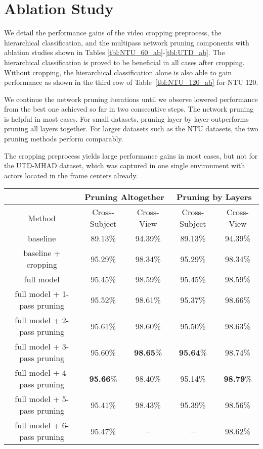 \documentclass{article}
\begin{document}
 \section{Ablation Study}

{We detail the performance gains of the video cropping preprocess, the hierarchical classification, and the multipass network pruning components with ablation studies shown in Tables \ref{tbl:NTU_60_ab}-\ref{tbl:UTD_ab}. The hierarchical classification is proved to be beneficial in all cases after cropping. Without cropping, the hierarchical classification alone is also able to gain performance as shown in the third row of Table~\ref{tbl:NTU_120_ab} for NTU 120.} 

{We continue the network pruning iterations until we observe lowered performance from the best one achieved so far in two consecutive steps. The network pruning is helpful in most cases. 
For small datasets, pruning layer by layer outperforms pruning all layers together. For larger datasets such as the NTU datasets, the two pruning methods perform comparably.}

{The cropping preprocess yields large performance gains in most cases, but not for the UTD-MHAD dataset, which was captured in one single environment with actors located in the frame centers already.}

\begin{table*}
\begin{center}
\caption{Ablation Study on NTU 60 dataset. The baseline model refers to the Inflated ResNet50 network trained without hierarchical loss using the original videos. The full model refers to the baseline network trained with the hierarchical loss using cropped video input.}
\label{tbl:NTU_60_ab}
\begin{tabular}{|c|c|c|c|c|}
\hline
 & \multicolumn{2}{c|}{Pruning Altogether} & \multicolumn{2}{c|}{Pruning by Layers}\\
\hline
Method & Cross-Subject & Cross-View & Cross-Subject & Cross-View \\
\hline
baseline & 89.13\% & 94.39\% & 89.13\% & 94.39\% \\
baseline + cropping & 95.29\% & 98.34\% & 95.29\% & 98.34\% \\
full model & 95.45\% & 98.59\% & 95.45\% & 98.59\% \\
full model + 1-pass pruning & 95.52\% & 98.61\% & 95.37\% & 98.66\%\\
full model + 2-pass pruning & 95.61\% & 98.60\% & 95.50\% & 98.63\%\\
full model + 3-pass pruning & 95.60\% & \textbf{98.65}\% & \textbf{95.64}\% & 98.74\%\\
full model + 4-pass pruning & \textbf{95.66}\% & 98.40\% & 95.14\% & \textbf{98.79}\%\\
full model + 5-pass pruning & 95.41\% & 98.43\% & 95.39\% & 98.56\%\\
full model + 6-pass pruning & 95.47\% & -- & -- & 98.62\% \\
\hline
\end{tabular}
\end{center}
\end{table*}
\end{document}
